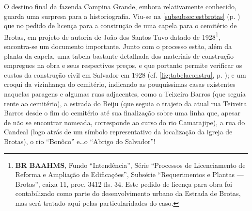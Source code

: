 





















O destino final da fazenda Campina Grande, embora relativamente conhecido, guarda uma surpresa para a historiografia. Viu-se na \autoref{subsubsec:estbrotas} (p. \pageref{subsubsec:estbrotas}) que no pedido de licença para a construção de uma capela para o cemitério de Brotas, em projeto de autoria de João dos Santos Tuvo datado de 1928\footnote{\textbf{BR BAAHMS}, Fundo ``Intendência'', Série ``Processos de Licenciamento de Reforma e Ampliação de Edificações'', Subsérie ``Requerimentos e Plantas --- Brotas'', caixa 11, proc. 3412 fls. 34. Este pedido de licença para obra foi contabilizado como parte do desenvolvimento urbano da Estrada de Brotas, mas será tratado aqui pelas particularidades do caso.}, encontra-se um documento importante. Junto com o processo estão, além da planta da capela, uma tabela bastante detalhada dos materiais de construção empregues na obra e seus respectivos preços, e que portanto permite verificar os custos da construção civil em Salvador em 1928 (cf. \autoref{fig:tabelaconstru}, p. \pageref{fig:tabelaconstru}); e um croqui da vizinhança do cemitério, indicando as pouquíssimas casas existentes naquelas paragens e algumas ruas adjacentes, como a Teixeira Barros (que seguia rente ao cemitério), a estrada do Beiju (que seguia o trajeto da atual rua Teixeira Barros desde o fim do cemitério até sua finalização sobre uma linha que, apesar de não se encontrar nomeada, corresponde ao curso do rio Camarajipe), a rua do Candeal (logo atrás de um símbolo representativo da localização da igreja de Brotas), o rio ``Bonôco'' e\dots o ``Abrigo do Salvador''!

